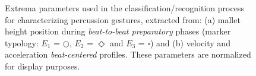 \begin{figure}%
	\begin{center}
		\hspace{6mm}
	\end{center}
	\vspace{-0.5cm}
	\caption[Characterization of timpani playing techniques]{Extrema parameters used in the classification/recognition process for characterizing percussion gestures, extracted from: (a) mallet height position during \emph{beat-to-beat preparatory} phases (marker typology: $E_1$ = $\bigcirc$, $E_2$ = $\Diamond$ and $E_3$ = $\square$) and (b) velocity and acceleration \emph{beat-centered} profiles. These parameters are normalized for display purposes.}
	\label{fig:classifParameters}
\end{figure}

